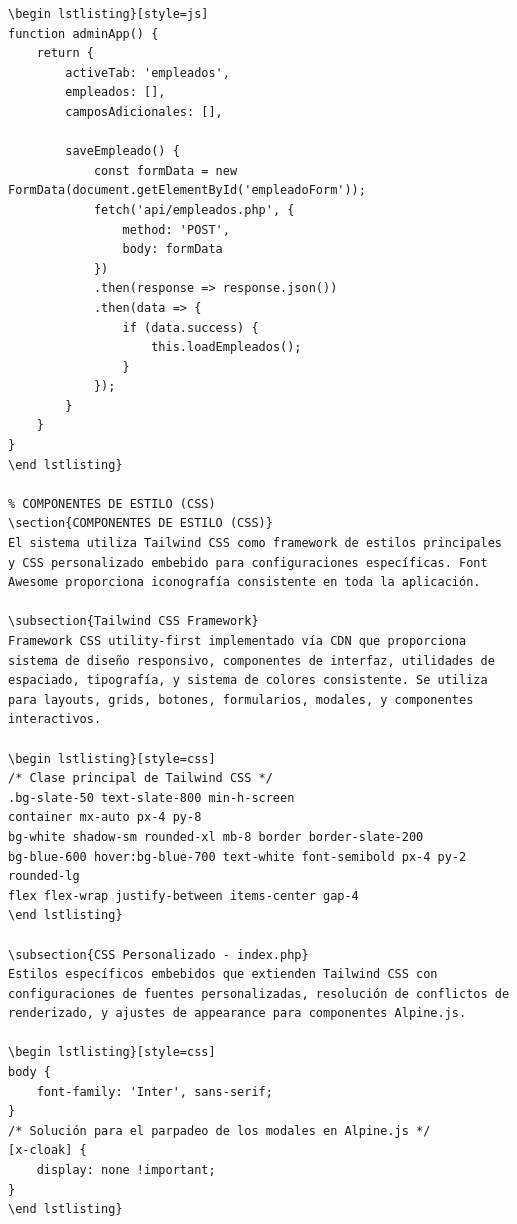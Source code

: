 \documentclass[12pt,a4paper]{article}
\begin{document}
\begin{lstlisting}[style=php]
\begin lstlisting}[style=js]
function adminApp() {
    return {
        activeTab: 'empleados',
        empleados: [],
        camposAdicionales: [],
        
        saveEmpleado() {
            const formData = new FormData(document.getElementById('empleadoForm'));
            fetch('api/empleados.php', {
                method: 'POST',
                body: formData
            })
            .then(response => response.json())
            .then(data => {
                if (data.success) {
                    this.loadEmpleados();
                }
            });
        }
    }
}
\end lstlisting}

% COMPONENTES DE ESTILO (CSS)
\section{COMPONENTES DE ESTILO (CSS)}
El sistema utiliza Tailwind CSS como framework de estilos principales y CSS personalizado embebido para configuraciones específicas. Font Awesome proporciona iconografía consistente en toda la aplicación.

\subsection{Tailwind CSS Framework}
Framework CSS utility-first implementado vía CDN que proporciona sistema de diseño responsivo, componentes de interfaz, utilidades de espaciado, tipografía, y sistema de colores consistente. Se utiliza para layouts, grids, botones, formularios, modales, y componentes interactivos.

\begin lstlisting}[style=css]
/* Clase principal de Tailwind CSS */
.bg-slate-50 text-slate-800 min-h-screen
container mx-auto px-4 py-8
bg-white shadow-sm rounded-xl mb-8 border border-slate-200
bg-blue-600 hover:bg-blue-700 text-white font-semibold px-4 py-2 rounded-lg
flex flex-wrap justify-between items-center gap-4
\end lstlisting}

\subsection{CSS Personalizado - index.php}
Estilos específicos embebidos que extienden Tailwind CSS con configuraciones de fuentes personalizadas, resolución de conflictos de renderizado, y ajustes de appearance para componentes Alpine.js.

\begin lstlisting}[style=css]
body { 
    font-family: 'Inter', sans-serif; 
}
/* Solución para el parpadeo de los modales en Alpine.js */
[x-cloak] { 
    display: none !important; 
}
\end lstlisting}


\end{lstlisting}
\end{document}
